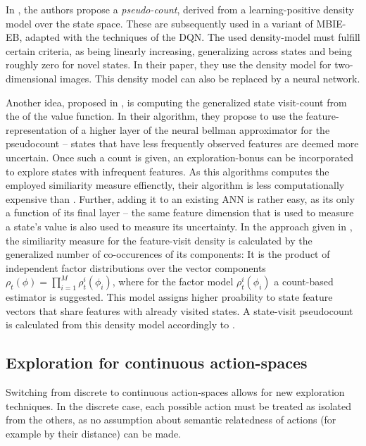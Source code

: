 In \cite{bellemare_unifying_2016}, the authors propose a \textit{pseudo-count}, derived from a learning-positive density model over the state space. These are subsequently used in a variant of MBIE-EB, adapted with the techniques of the DQN. The used density-model must fulfill certain criteria, as being linearly increasing, generalizing across states and being roughly zero for novel states. In their paper, they use the  density model for two-dimensional images. This density model can also be replaced by a neural network.

Another idea, proposed in \cite{martin_count-based_2017}, is computing the generalized state visit-count from the  of the value function. In their algorithm, they propose to use the feature-representation of a higher layer of the neural bellman approximator for the pseudocount -- states that have less frequently observed features are deemed more uncertain. Once such a count is given, an exploration-bonus can be incorporated to explore states with infrequent features. As this algorithms computes the employed similiarity measure effienctly, their algorithm is less computationally expensive than \cite{bellemare_unifying_2016}. Further, adding it to an existing ANN is rather easy, as its only a function of its final layer -- the same feature dimension that is used to measure a state's value is also used to measure its uncertainty. In the approach given in \cite{martin_count-based_2017}, the similiarity measure for the feature-visit density is calculated by the generalized number of co-occurences of its components: It is the product of independent factor distributions over the vector components $\rho_t(\phi) = \prod_{i=1}^{M}\rho_t^i(\phi_i)$, where for the factor model $\rho_t^i(\phi_i)$ a count-based estimator is suggested. This model assigns higher proability to state feature vectors that share features with already visited states. A state-visit pseudocount is calculated from this density model accordingly to \cite{bellemare_unifying_2016}. 


\subsection{Exploration for continuous action-spaces}

\label{sec:contexptheory}

Switching from discrete to continuous action-spaces allows for new exploration techniques. In the discrete case, each possible action must be treated as isolated from the others, as no assumption about semantic relatedness of actions (for example by their distance) can be made. 

